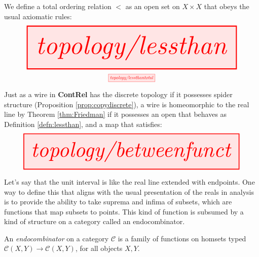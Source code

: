 \begin{defn}\label{defn:lessthan}
We define a total ordering relation $<$ as an open set on $X \times X$ that obeys the usual axiomatic rules:
\[\resizebox{\textwidth}{!}{\tikzfig{topology/lessthan}}\]
\[\scalebox{0.65}{\tikzfig{topology/lessthantotal}}\]
\end{defn}
\begin{defn}\label{defn:friedfunct}
Just as a wire in \textbf{ContRel} has the discrete topology if it possesses spider structure (Proposition \ref{prop:copydiscrete}), a wire is homeomorphic to the real line by Theorem \ref{thm:Friedman} if it possesses an open that behaves as Definition \ref{defn:lessthan}, and a map that satisfies:
\[\resizebox{\textwidth}{!}{\tikzfig{topology/betweenfunct}}\]
\end{defn}

Let's say that the unit interval is like the real line extended with endpoints. One way to define this that aligns with the usual presentation of the reals in analysis is to provide the ability to take suprema and infima of subsets, which are functions that map subsets to points. This kind of function is subsumed by a kind of structure on a category called an endocombinator.

\begin{defn}[Endocombinator]
An \emph{endocombinator} on a category $\mathcal{C}$ is a family of functions on homsets typed $\mathcal{C}(X,Y) \rightarrow \mathcal{C}(X,Y)$, for all objects $X,Y$.
\end{defn}

